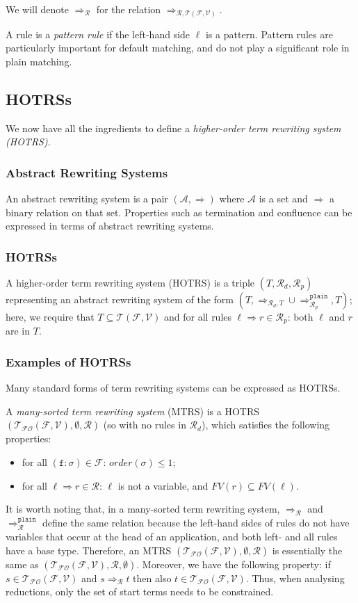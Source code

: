 \documentclass{lmcs}
\theoremstyle{theorem}\newtheorem{theorem}[dummy]{Theorem}
\theoremstyle{theorem}\newtheorem{lemma}[dummy]{Lemma}
\theoremstyle{theorem}\newtheorem{corollary}[dummy]{Corollary}
\theoremstyle{definition}\newtheorem{definition}[dummy]{Definition}
\theoremstyle{definition}\newtheorem{example}[dummy]{Example}
\newcommand{\F}{\mathcal{F}}
\newcommand{\V}{\mathcal{V}}
\newcommand{\Terms}{\mathcal{T}}
\newcommand{\FOTerms}{\mathcal{T}_{\mathcal{FO}}}
\newcommand{\Rules}{\mathcal{R}}
\newcommand{\FV}{\mathit{FV}}
\newcommand{\order}{\mathit{order}}
\newcommand{\atype}{\sigma}
\newcommand{\identifier}[1]{\mathtt{#1}}
\newcommand{\afun}{\identifier{f}}
\newcommand{\arrz}{\Rightarrow}
\newcommand{\arr}[1]{\arrz_{#1}}
\newcommand{\mysubsection}[1]{\vspace{-12pt}\subsubsection{#1}}
\begin{document}
\medskip
We will denote $\arr{\Rules}$ for the relation $\arr{\Rules,\Terms(\F,\V)}$.

A rule is a \emph{pattern rule} if the left-hand side $\ell$ is a pattern. Pattern rules are
particularly important for default matching, and do not play a significant role in plain matching.

\subsection{HOTRSs}

We now have all the ingredients to define a \emph{higher-order term rewriting system (HOTRS)}.

\mysubsection{Abstract Rewriting Systems}

An abstract rewriting system is a pair $(\mathcal{A},\arrz)$ where $\mathcal{A}$ is a set and
$\arrz$ a binary relation on that set.  Properties such as termination and confluence can be
expressed in terms of abstract rewriting systems.

\mysubsection{HOTRSs}

A higher-order term rewriting system (HOTRS) is a triple $(T,\Rules_d,\Rules_p)$ representing
an abstract rewriting system of the form $(T,\arr{\Rules_d,T} \cup
\arr{\Rules_p}^{\mathtt{plain}},T)$; here, we require that $T \subseteq \Terms(\F,\V)$ and for
all rules $\ell \arrz r \in \Rules_p$: both $\ell$ and $r$ are in $T$.

\mysubsection{Examples of HOTRSs}
Many standard forms of term rewriting systems can be expressed as HOTRSs.

A \emph{many-sorted term rewriting system} (MTRS) is a HOTRS $(\FOTerms(\F,\V), \emptyset,
\Rules)$ (so with no rules in $\Rules_d$), which satisfies the following properties:
\begin{itemize}
\item for all $(\afun : \atype) \in \F$: $\order(\atype) \leq 1$;
\item for all $\ell \arrz r \in \Rules$: $\ell$ is not a variable, and $\FV(r) \subseteq \FV(\ell)$.
\end{itemize}
It is worth noting that, in a many-sorted term rewriting system, $\arr{\Rules}$ and
$\arr{\Rules}^{\mathtt{plain}}$ define the same relation because the left-hand sides of rules do
not have variables that occur at the head of an application, and both left- and all rules have
a base type. Therefore, an MTRS $(\FOTerms(\F,\V),\emptyset,\Rules)$ is essentially the same as
$(\FOTerms(\F,\V),\Rules,\emptyset)$.
Moreover, we have the following property: if $s \in \FOTerms(\F,\V)$ and $s \arr{\Rules} t$
then also $t \in \FOTerms(\F,\V)$. Thus, when analysing reductions, only the set of start terms
needs to be constrained.
\end{document}
